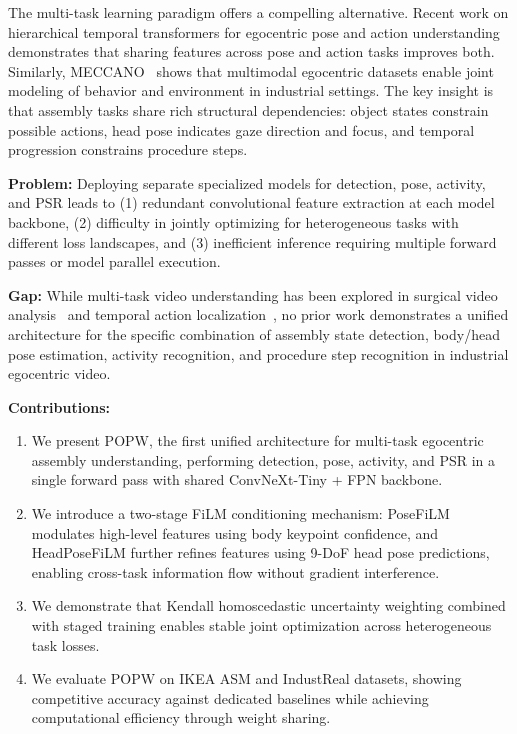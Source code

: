 \documentclass[11pt,a4paper]{article}
\newcommand{\popw}{POPW}
\begin{document}
The multi-task learning paradigm offers a compelling alternative. Recent work on hierarchical temporal transformers for egocentric pose and action understanding~\cite{wen2022hierarchical} demonstrates that sharing features across pose and action tasks improves both. Similarly, MECCANO~\cite{ragusa2022meccano} shows that multimodal egocentric datasets enable joint modeling of behavior and environment in industrial settings. The key insight is that assembly tasks share rich structural dependencies: object states constrain possible actions, head pose indicates gaze direction and focus, and temporal progression constrains procedure steps.

\textbf{Problem:} Deploying separate specialized models for detection, pose, activity, and PSR leads to (1) redundant convolutional feature extraction at each model backbone, (2) difficulty in jointly optimizing for heterogeneous tasks with different loss landscapes, and (3) inefficient inference requiring multiple forward passes or model parallel execution.

\textbf{Gap:} While multi-task video understanding has been explored in surgical video analysis~\cite{kim2025surgical} and temporal action localization~\cite{duong2025multitask}, no prior work demonstrates a unified architecture for the specific combination of assembly state detection, body/head pose estimation, activity recognition, and procedure step recognition in industrial egocentric video.

\textbf{Contributions:}
\begin{enumerate}
\item We present \popw{}, the first unified architecture for multi-task egocentric assembly understanding, performing detection, pose, activity, and PSR in a single forward pass with shared ConvNeXt-Tiny + FPN backbone.
\item We introduce a two-stage FiLM conditioning mechanism: PoseFiLM modulates high-level features using body keypoint confidence, and HeadPoseFiLM further refines features using 9-DoF head pose predictions, enabling cross-task information flow without gradient interference.
\item We demonstrate that Kendall homoscedastic uncertainty weighting combined with staged training enables stable joint optimization across heterogeneous task losses.
\item We evaluate \popw{} on IKEA ASM and IndustReal datasets, showing competitive accuracy against dedicated baselines while achieving computational efficiency through weight sharing.
\end{enumerate}
\end{document}
